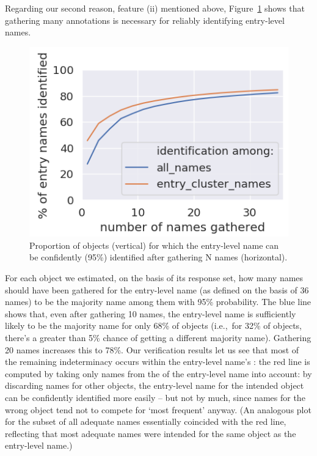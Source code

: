 Regarding our second reason, feature (ii) mentioned above, Figure~\ref{fig:entry-level-name-stability} shows that gathering many annotations is necessary for reliably identifying entry-level names.
\begin{figure}[t]
	\includegraphics[width=.9\columnwidth]{images/stability_analytic.png}
	\caption{Proportion of objects (vertical) for which the entry-level name can be confidently (95\%) identified after gathering N names (horizontal). }
	\label{fig:entry-level-name-stability}
\end{figure}
For each object we estimated, on the basis of its \mn response set, how many names should have been gathered for the entry-level name (as defined on the basis of 36 names) to be the majority name among them with 95\% probability.
The blue line shows that, even after gathering 10 names, the entry-level name is sufficiently likely to be the majority name for only 68\% of objects (i.e.,~for 32\% of objects, there's a greater than 5\% chance of getting a different majority name).
Gathering 20 names increases this to 78\%.
Our verification results let us see that most of the remaining indeterminacy occurs within the entry-level name's \cluster:
the red line is computed by taking only names from the \cluster of the entry-level name into account:
by discarding names for other objects, the entry-level name for the intended object can be confidently identified more easily -- but not by much, since names for the wrong object tend not to compete for `most frequent' anyway.
(An analogous plot for the subset of all adequate names essentially coincided with the red line, reflecting that most adequate names were intended for the same object as the entry-level name.)

